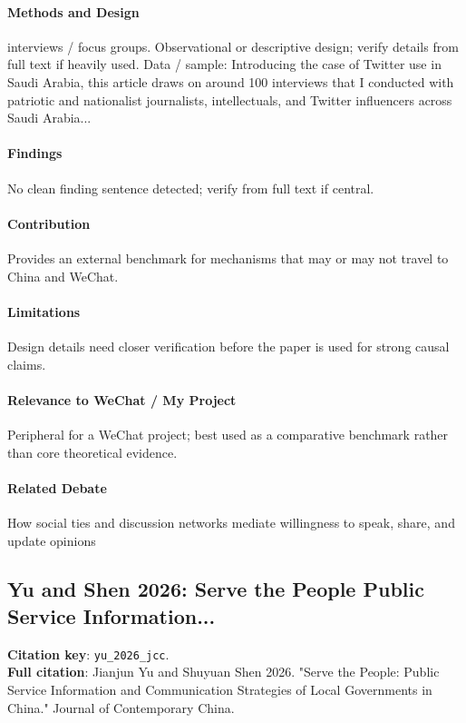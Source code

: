 \documentclass[12pt]{article}
\begin{document}
\paragraph{Methods and Design} interviews / focus groups. Observational or descriptive design; verify details from full text if heavily used. Data / sample: Introducing the case of Twitter use in Saudi Arabia, this article draws on around 100 interviews that I conducted with patriotic and nationalist journalists, intellectuals, and Twitter influencers across Saudi Arabia...

\paragraph{Findings} No clean finding sentence detected; verify from full text if central.

\paragraph{Contribution} Provides an external benchmark for mechanisms that may or may not travel to China and WeChat.

\paragraph{Limitations} Design details need closer verification before the paper is used for strong causal claims.

\paragraph{Relevance to WeChat / My Project} Peripheral for a WeChat project; best used as a comparative benchmark rather than core theoretical evidence.

\paragraph{Related Debate} How social ties and discussion networks mediate willingness to speak, share, and update opinions


\subsection{Yu and Shen 2026: Serve the People Public Service Information...}
\textbf{Citation key}: \texttt{yu\_2026\_jcc}.\\
\textbf{Full citation}: Jianjun Yu and Shuyuan Shen 2026. "Serve the People: Public Service Information and Communication Strategies of Local Governments in China." Journal of Contemporary China.
\end{document}
